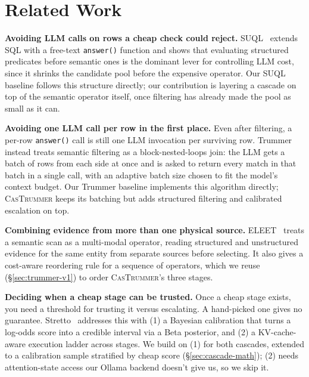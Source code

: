 \documentclass[sigconf]{acmart}
\begin{document}


\section{Related Work}
\label{sec:related}


\textbf{Avoiding LLM calls on rows a cheap check could reject.}
SUQL~\cite{liu2023suql} extends SQL with a free-text \texttt{answer()} function and shows that evaluating structured predicates before semantic ones is the dominant lever for controlling LLM cost, since it shrinks the candidate pool before the expensive operator. Our SUQL baseline follows this structure directly; our contribution is layering a cascade on top of the semantic operator itself, once filtering has already made the pool as small as it can.

\textbf{Avoiding one LLM call per row in the first place.} Even after filtering, a per-row \texttt{answer()} call is still one LLM invocation per surviving row. Trummer~\cite{trummer2025semanticjoin} instead treats semantic filtering as a block-nested-loops join: the LLM gets a batch of rows from each side at once and is asked to return every match in that batch in a single call, with an adaptive batch size chosen to fit the model's context budget. Our Trummer baseline implements this algorithm directly; \textsc{CasTrummer} keeps its batching but adds structured filtering and calibrated escalation on top.

\textbf{Combining evidence from more than one physical source.}
ELEET~\cite{urban2024eleet} treats a semantic scan as a multi-modal operator, reading structured and unstructured evidence for the same entity from separate sources before selecting. It also gives a cost-aware reordering rule for a sequence of operators, which we reuse (\S\ref{sec:trummer-v1}) to order \textsc{CasTrummer}'s three stages.

\textbf{Deciding when a cheap stage can be trusted.} Once a cheap stage exists, you need a threshold for trusting it versus escalating. A hand-picked one gives no guarantee. Stretto~\cite{sanmartino2025stretto} addresses this with (1) a Bayesian calibration that turns a log-odds score into a credible interval via a Beta posterior, and (2) a KV-cache-aware execution ladder across stages. We build on (1) for both cascades, extended to a calibration sample stratified by cheap score (\S\ref{sec:cascade-math}); (2) needs attention-state access our Ollama backend doesn't give us, so we skip it.
\end{document}
